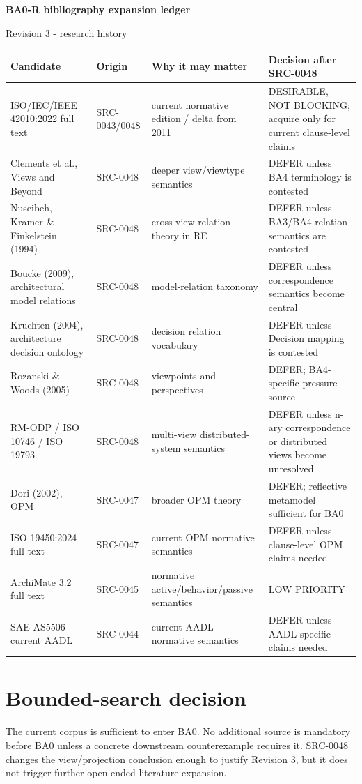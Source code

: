 \documentclass[10pt,a4paper]{article}
\begin{document}
\begin{center}{\LARGE\bfseries BA0-R bibliography expansion ledger}\par{\large Revision 3 - research history}\end{center}
\begin{landscape}\scriptsize
\begin{longtable}{p{5.2cm}p{2.5cm}p{8.0cm}p{6.4cm}}\toprule Candidate & Origin & Why it may matter & Decision after SRC-0048\\\midrule\endhead
ISO/IEC/IEEE 42010:2022 full text & SRC-0043/0048 & current normative edition / delta from 2011 & DESIRABLE, NOT BLOCKING; acquire only for current clause-level claims\\
Clements et al., Views and Beyond & SRC-0048 & deeper view/viewtype semantics & DEFER unless BA4 terminology is contested\\
Nuseibeh, Kramer \& Finkelstein (1994) & SRC-0048 & cross-view relation theory in RE & DEFER unless BA3/BA4 relation semantics are contested\\
Boucke (2009), architectural model relations & SRC-0048 & model-relation taxonomy & DEFER unless correspondence semantics become central\\
Kruchten (2004), architecture decision ontology & SRC-0048 & decision relation vocabulary & DEFER unless Decision mapping is contested\\
Rozanski \& Woods (2005) & SRC-0048 & viewpoints and perspectives & DEFER; BA4-specific pressure source\\
RM-ODP / ISO 10746 / ISO 19793 & SRC-0048 & multi-view distributed-system semantics & DEFER unless n-ary correspondence or distributed views become unresolved\\
Dori (2002), OPM & SRC-0047 & broader OPM theory & DEFER; reflective metamodel sufficient for BA0\\
ISO 19450:2024 full text & SRC-0047 & current OPM normative semantics & DEFER unless clause-level OPM claims needed\\
ArchiMate 3.2 full text & SRC-0045 & normative active/behavior/passive semantics & LOW PRIORITY\\
SAE AS5506 current AADL & SRC-0044 & current AADL normative semantics & DEFER unless AADL-specific claims needed\\
\bottomrule\end{longtable}\end{landscape}
\section{Bounded-search decision}
The current corpus is sufficient to enter BA0. No additional source is mandatory before BA0 unless a concrete downstream counterexample requires it. SRC-0048 changes the view/projection conclusion enough to justify Revision 3, but it does not trigger further open-ended literature expansion.
\end{document}
